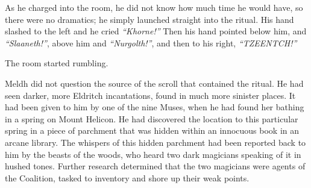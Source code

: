 As he charged into the room, he did not know how much time he would have, so there were no dramatics; he simply launched straight into the ritual. His hand slashed to the left and he cried \emph{“Khorne!”} Then his hand pointed below him, and \emph{“Slaaneth!”}, above him and \emph{“Nurgolth!”}, and then to his right, \emph{“TZEENTCH!”}

The room started rumbling.


Meldh did not question the source of the scroll that contained the ritual. He had seen darker, more Eldritch incantations, found in much more sinister places. It had been given to him by one of the nine Muses, when he had found her bathing in a spring on Mount Helicon. He had discovered the location to this particular spring in a piece of parchment that was hidden within an innocuous book in an arcane library. The whispers of this hidden parchment had been reported back to him by the beasts of the woods, who heard two dark magicians speaking of it in hushed tones. Further research determined that the two magicians were agents of the Coalition, tasked to inventory and shore up their weak points.

